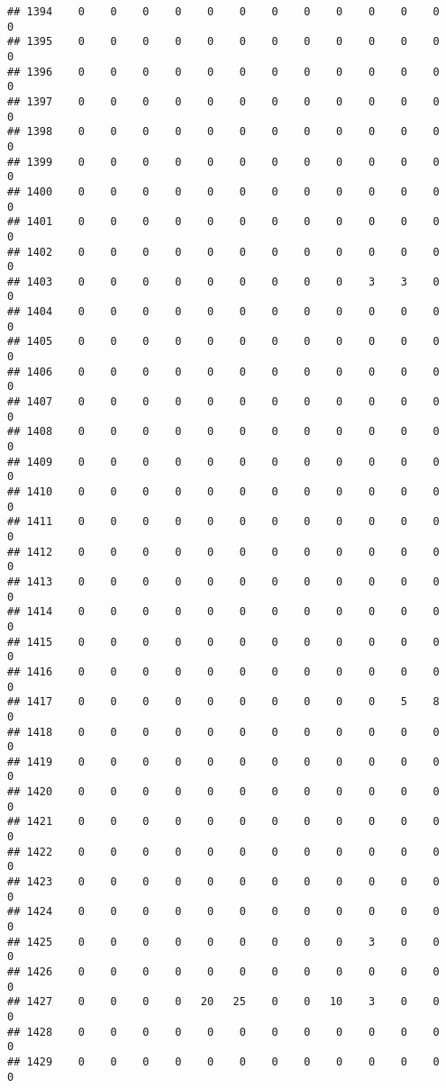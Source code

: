 \documentclass[]{article}
\begin{document}
\begin{verbatim}
## 1394    0    0    0    0    0    0    0    0    0    0    0    0    0
## 1395    0    0    0    0    0    0    0    0    0    0    0    0    0
## 1396    0    0    0    0    0    0    0    0    0    0    0    0    0
## 1397    0    0    0    0    0    0    0    0    0    0    0    0    0
## 1398    0    0    0    0    0    0    0    0    0    0    0    0    0
## 1399    0    0    0    0    0    0    0    0    0    0    0    0    0
## 1400    0    0    0    0    0    0    0    0    0    0    0    0    0
## 1401    0    0    0    0    0    0    0    0    0    0    0    0    0
## 1402    0    0    0    0    0    0    0    0    0    0    0    0    0
## 1403    0    0    0    0    0    0    0    0    0    3    3    0    0
## 1404    0    0    0    0    0    0    0    0    0    0    0    0    0
## 1405    0    0    0    0    0    0    0    0    0    0    0    0    0
## 1406    0    0    0    0    0    0    0    0    0    0    0    0    0
## 1407    0    0    0    0    0    0    0    0    0    0    0    0    0
## 1408    0    0    0    0    0    0    0    0    0    0    0    0    0
## 1409    0    0    0    0    0    0    0    0    0    0    0    0    0
## 1410    0    0    0    0    0    0    0    0    0    0    0    0    0
## 1411    0    0    0    0    0    0    0    0    0    0    0    0    0
## 1412    0    0    0    0    0    0    0    0    0    0    0    0    0
## 1413    0    0    0    0    0    0    0    0    0    0    0    0    0
## 1414    0    0    0    0    0    0    0    0    0    0    0    0    0
## 1415    0    0    0    0    0    0    0    0    0    0    0    0    0
## 1416    0    0    0    0    0    0    0    0    0    0    0    0    0
## 1417    0    0    0    0    0    0    0    0    0    0    5    8    0
## 1418    0    0    0    0    0    0    0    0    0    0    0    0    0
## 1419    0    0    0    0    0    0    0    0    0    0    0    0    0
## 1420    0    0    0    0    0    0    0    0    0    0    0    0    0
## 1421    0    0    0    0    0    0    0    0    0    0    0    0    0
## 1422    0    0    0    0    0    0    0    0    0    0    0    0    0
## 1423    0    0    0    0    0    0    0    0    0    0    0    0    0
## 1424    0    0    0    0    0    0    0    0    0    0    0    0    0
## 1425    0    0    0    0    0    0    0    0    0    3    0    0    0
## 1426    0    0    0    0    0    0    0    0    0    0    0    0    0
## 1427    0    0    0    0   20   25    0    0   10    3    0    0    0
## 1428    0    0    0    0    0    0    0    0    0    0    0    0    0
## 1429    0    0    0    0    0    0    0    0    0    0    0    0    0

\end{verbatim}
\end{document}
